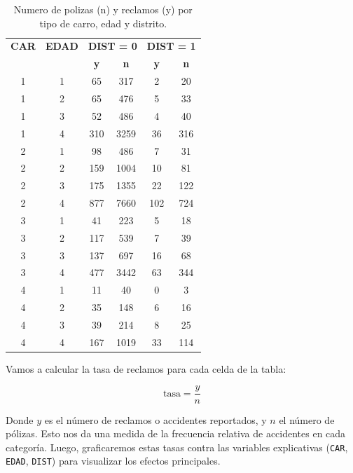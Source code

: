 \begin{table}[h!]
    \centering
    \begin{tabular}{cc|cc|cc}
        \hline
        \textbf{CAR} & \textbf{EDAD} & \multicolumn{2}{c|}{\textbf{DIST = 0}} & \multicolumn{2}{c}{\textbf{DIST = 1}} \\
        & & \textbf{y} & \textbf{n} & \textbf{y} & \textbf{n} \\
        \hline
        1 & 1 & 65  & 317  & 2   & 20   \\
        1 & 2 & 65  & 476  & 5   & 33   \\
        1 & 3 & 52  & 486  & 4   & 40   \\
        1 & 4 & 310 & 3259 & 36  & 316  \\
        \hline
        2 & 1 & 98  & 486  & 7   & 31   \\
        2 & 2 & 159 & 1004 & 10  & 81   \\
        2 & 3 & 175 & 1355 & 22  & 122  \\
        2 & 4 & 877 & 7660 & 102 & 724  \\
        \hline
        3 & 1 & 41  & 223  & 5   & 18   \\
        3 & 2 & 117 & 539  & 7   & 39   \\
        3 & 3 & 137 & 697  & 16  & 68  \\
        3 & 4 & 477 & 3442 & 63  & 344  \\
        \hline
        4 & 1 & 11  & 40   & 0   & 3    \\
        4 & 2 & 35  & 148  & 6   & 16   \\
        4 & 3 & 39  & 214  & 8   & 25   \\
        4 & 4 & 167 & 1019 & 33  & 114  \\
        \hline
    \end{tabular}
    \caption{Numero de polizas (n) y reclamos (y) por tipo de carro, edad y distrito.}
    \label{tab:seguros}
\end{table}



Vamos a calcular la tasa de reclamos para cada celda de la tabla:

\[
    \text{tasa} = \frac{y}{n}
\]

Donde $y$ es el número de reclamos o accidentes reportados, y $n$ el número de pólizas. Esto nos da 
una medida de la frecuencia relativa de accidentes en cada categoría. Luego, graficaremos estas tasas 
contra las variables explicativas (\texttt{CAR}, \texttt{EDAD}, \texttt{DIST}) para visualizar los
efectos principales.  

